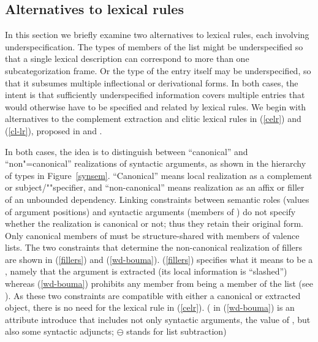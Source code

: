 \documentclass[output=paper
 	        ,biblatex
                ,babelshorthands
                ,newtxmath
                ,draftmode
                ,colorlinks, citecolor=brown
]{langscibook}
\begin{document}
\subsection{Alternatives to lexical rules}
\label{sec:alt}

In this section we briefly examine two alternatives to lexical rules, each involving underspecification. The types of members of the  list might be underspecified so that a single lexical description can correspond to more than one subcategorization frame. Or the type of the entry itself may be underspecified, so that it subsumes multiple inflectional or derivational forms. In both cases, the intent is that sufficiently underspecified information covers multiple entries that would otherwise have to be specified and related by lexical rules. We begin with alternatives to the complement extraction and clitic lexical rules in (\ref{celr}) and (\ref{cl-lr}), proposed in  and .%

In both cases, the idea is to distinguish between ``canonical'' and ``non"=canonical'' realizations of syntactic arguments, as shown in the hierarchy of  types in Figure~\ref{synsem}. ``Canonical'' means local realization as a complement or subject/""specifier, and ``non-canonical'' means realization as an affix or filler of an unbounded dependency. Linking constraints between semantic roles (values of argument positions) and syntactic arguments (members of ) do not specify whether the realization is canonical or not; thus they retain their original form. Only canonical members of  must be structure-shared with members of valence lists. The two constraints that determine the non-canonical realization of fillers are shown in (\ref{fillers}) and (\ref{wd-bouma}). (\ref{fillers}) specifies what it means to be a , namely that the argument is extracted (its local information is ``slashed'') whereas (\ref{wd-bouma}) prohibits any  member from being a member of the  list (see \citealt[23]{Boumaetal2001}). As these two constraints are compatible with either a canonical or extracted object, there is no need for the lexical rule in (\ref{celr}). ( in (\ref{wd-bouma}) is an attribute \citeauthor{Boumaetal2001} introduce that includes not only syntactic arguments, the value of , but also some syntactic adjuncts; $\ominus$ stands for list subtraction)
\end{document}
